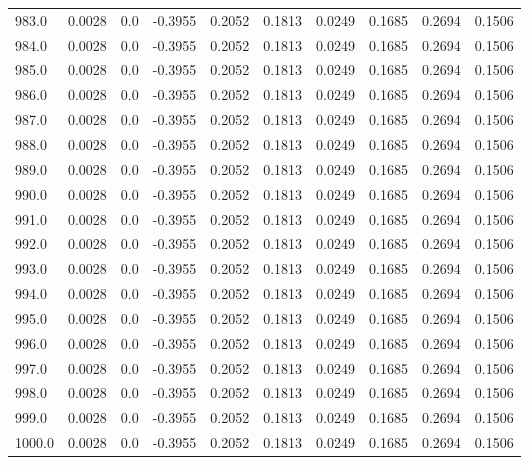 \begin{longtable}{lrrrrrrrrr}
983.0 & 0.0028 & 0.0 & -0.3955 & 0.2052 & 0.1813 & 0.0249 & 0.1685 & 0.2694 & 0.1506 \\
984.0 & 0.0028 & 0.0 & -0.3955 & 0.2052 & 0.1813 & 0.0249 & 0.1685 & 0.2694 & 0.1506 \\
985.0 & 0.0028 & 0.0 & -0.3955 & 0.2052 & 0.1813 & 0.0249 & 0.1685 & 0.2694 & 0.1506 \\
986.0 & 0.0028 & 0.0 & -0.3955 & 0.2052 & 0.1813 & 0.0249 & 0.1685 & 0.2694 & 0.1506 \\
987.0 & 0.0028 & 0.0 & -0.3955 & 0.2052 & 0.1813 & 0.0249 & 0.1685 & 0.2694 & 0.1506 \\
988.0 & 0.0028 & 0.0 & -0.3955 & 0.2052 & 0.1813 & 0.0249 & 0.1685 & 0.2694 & 0.1506 \\
989.0 & 0.0028 & 0.0 & -0.3955 & 0.2052 & 0.1813 & 0.0249 & 0.1685 & 0.2694 & 0.1506 \\
990.0 & 0.0028 & 0.0 & -0.3955 & 0.2052 & 0.1813 & 0.0249 & 0.1685 & 0.2694 & 0.1506 \\
991.0 & 0.0028 & 0.0 & -0.3955 & 0.2052 & 0.1813 & 0.0249 & 0.1685 & 0.2694 & 0.1506 \\
992.0 & 0.0028 & 0.0 & -0.3955 & 0.2052 & 0.1813 & 0.0249 & 0.1685 & 0.2694 & 0.1506 \\
993.0 & 0.0028 & 0.0 & -0.3955 & 0.2052 & 0.1813 & 0.0249 & 0.1685 & 0.2694 & 0.1506 \\
994.0 & 0.0028 & 0.0 & -0.3955 & 0.2052 & 0.1813 & 0.0249 & 0.1685 & 0.2694 & 0.1506 \\
995.0 & 0.0028 & 0.0 & -0.3955 & 0.2052 & 0.1813 & 0.0249 & 0.1685 & 0.2694 & 0.1506 \\
996.0 & 0.0028 & 0.0 & -0.3955 & 0.2052 & 0.1813 & 0.0249 & 0.1685 & 0.2694 & 0.1506 \\
997.0 & 0.0028 & 0.0 & -0.3955 & 0.2052 & 0.1813 & 0.0249 & 0.1685 & 0.2694 & 0.1506 \\
998.0 & 0.0028 & 0.0 & -0.3955 & 0.2052 & 0.1813 & 0.0249 & 0.1685 & 0.2694 & 0.1506 \\
999.0 & 0.0028 & 0.0 & -0.3955 & 0.2052 & 0.1813 & 0.0249 & 0.1685 & 0.2694 & 0.1506 \\
1000.0 & 0.0028 & 0.0 & -0.3955 & 0.2052 & 0.1813 & 0.0249 & 0.1685 & 0.2694 & 0.1506 \\
\end{longtable}